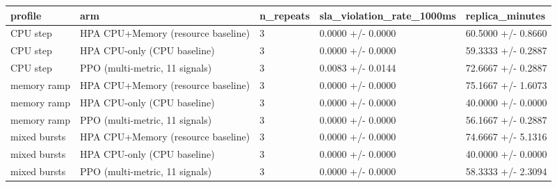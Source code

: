 \begin{tabular}{lllll}
\hline
profile & arm & n\_repeats & sla\_violation\_rate\_1000ms & replica\_minutes \\
\hline
CPU step & HPA CPU+Memory (resource baseline) & 3 & 0.0000 +/- 0.0000 & 60.5000 +/- 0.8660 \\
CPU step & HPA CPU-only (CPU baseline) & 3 & 0.0000 +/- 0.0000 & 59.3333 +/- 0.2887 \\
CPU step & PPO (multi-metric, 11 signals) & 3 & 0.0083 +/- 0.0144 & 72.6667 +/- 0.2887 \\
memory ramp & HPA CPU+Memory (resource baseline) & 3 & 0.0000 +/- 0.0000 & 75.1667 +/- 1.6073 \\
memory ramp & HPA CPU-only (CPU baseline) & 3 & 0.0000 +/- 0.0000 & 40.0000 +/- 0.0000 \\
memory ramp & PPO (multi-metric, 11 signals) & 3 & 0.0000 +/- 0.0000 & 56.1667 +/- 0.2887 \\
mixed bursts & HPA CPU+Memory (resource baseline) & 3 & 0.0000 +/- 0.0000 & 74.6667 +/- 5.1316 \\
mixed bursts & HPA CPU-only (CPU baseline) & 3 & 0.0000 +/- 0.0000 & 40.0000 +/- 0.0000 \\
mixed bursts & PPO (multi-metric, 11 signals) & 3 & 0.0000 +/- 0.0000 & 58.3333 +/- 2.3094 \\
\hline
\end{tabular}
